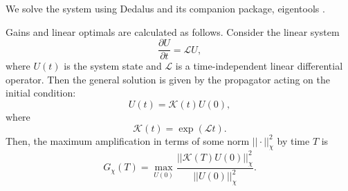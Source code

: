 \documentclass[%
 reprint,
 amsmath,amssymb,
 aps,
]{revtex4-2}
\newcommand{\Bzero}{\mathbf{B}_0}
\newcommand{\Uzero}{\mathbf{U}_0}
\newcommand{\vecpot}{\mathbf{A}}
\begin{document}
We solve the system using Dedalus \cite{2020PhRvR...2b3068B} and its companion package, eigentools \cite{2021JOSS....6.3079O}.

Gains and linear optimals are calculated as follows. Consider the linear system
\begin{equation}
\frac{\partial U}{\partial t} = \mathcal{L} U,
\label{eq:simplest_system}
\end{equation}
where $U(t)$ is the system state and $\mathcal{L}$ is a time-independent linear differential operator.  
Then the general solution is given by the propagator acting on the initial condition:
\begin{equation}
U(t) = \mathcal{K}(t) U(0),
\label{eq:simplest_solution}
\end{equation}
where
\begin{equation}
\mathcal{K}(t) = \exp(\mathcal{L} t).
\label{eq:simplest_propagator}
\end{equation}
Then, the maximum amplification in terms of some norm $|| \cdot ||_\chi^2$ by time $T$ is
\begin{equation}
G_\chi(T) = \max_{U(0)} \frac{|| \mathcal{K}(T) U(0) ||_\chi^2}{||U(0)||_\chi^2}.
\end{equation}
\end{document}
